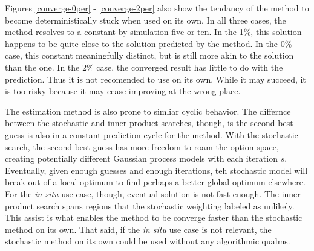 Figures \ref{converge-0per} - \ref{converge-2per} also show the tendancy of
the \innerprod method to become deterministically stuck when used on its own.
In all three cases, the \innerprod method resolves to a constant by 
simulation five or ten.  In the 1\%, this solution happens to be quite close
to the solution predicted by the \allflag method.  In the 0\% case, this
constant meaningfully distinct, but is still more akin to the \stochastic 
solution than the \allflag one.  In the 2\% case, the converged \innerprod
result has little to do with the \allflag prediction.  Thus it is not
recomended to use \innerprod on its own. While it may succeed, it is too 
risky because it may cease improving at the wrong place.

The \stochastic estimation method is also prone to simliar cyclic behavior.
The differnce between the stochastic and inner product searches, though,
is the second best guess is also in a constant prediction cycle for 
the \innerprod method.  With the stochastic search, the second best 
guess has more freedom to roam the option space, creating potentially 
different Gaussian process models with each iteration $s$.  Eventually, given 
enough guesses and enough iterations, teh stochastic model will break 
out of a local optimum to find perhaps a better global optimum elsewhere.
For the \emph{in situ} use case, though, eventual solution is not fast
enough.  The inner product search spans regions that the stochastic weighting
labeled as unlikely.  This assist is what enables the \allflag method
to be converge faster than the stochastic method on its own.  That said, 
if the \emph{in situ} use case is not relevant, the stochastic method on 
its own could be used without any algorithmic qualms.


